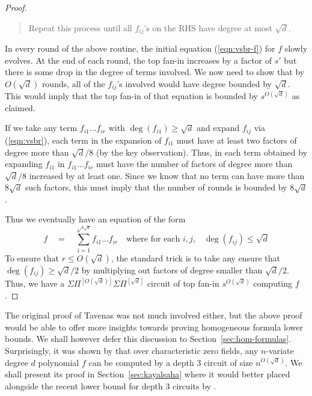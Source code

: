 \documentclass{beatcs}
\newcommand{\SPSPfanin}[2]{\Sigma\Pi^{[#1]}\Sigma\Pi^{[#2]}}
\begin{document}
\begin{proof}
\begin{mdframed}
\begin{quote}
Repeat this process until all $f_{ij}$'s on the RHS have degree at most $\sqrt{d}$. 
\end{quote}
\end{mdframed}

In every round of the above routine, the initial equation (\ref{eqn:vsbr-f}) for $f$ slowly evolves. 
At the end of each round, the top fan-in increases by a factor of $s'$ but there is some drop in the degree of terms involved. We now need to show that by $O(\sqrt{d})$ rounds, all of the $f_{ij}$'s involved would have degree bounded by $\sqrt{d}$. This would imply that the top fan-in of that equation is bounded by $s^{O(\sqrt{d})}$ as claimed. 

If we take any term $f_{i1}\dots f_{ir}$ with $\deg(f_{i1})\geq \sqrt{d}$ and expand $f_{ij}$ via (\ref{eqn:vsbr}), each term in the expansion of $f_{i1}$ must have at least two factors of degree more than $\sqrt{d}/8$ (by the key observation). Thus, in each term obtained by expanding $f_{i1}$ in $f_{i1}\dots f_{ir}$ must have the number of factors of degree more than $\sqrt{d}/8$ increased by at least one. Since we know that no term can have more than $8\sqrt{d}$ such factors, this must imply that the number of rounds is bounded by $8\sqrt{d}$. 

Thus we eventually have an equation of the form
\[
f\quad=\quad \sum_{i=1}^{s'^{8\sqrt{d}}} f_{i1}\dots f_{ir}\quad\text{where for each $i,j$,}\quad \deg(f_{ij})\leq \sqrt{d} 
\]
To ensure that $r\leq O(\sqrt{d})$, the standard trick is to take any ensure that $\deg(f_{ij}) \geq \sqrt{d}/2$ by multiplying out factors of degree smaller than $\sqrt{d}/2$. Thus, we have a $\SPSPfanin{O(\sqrt{d})}{\sqrt{d}}$ circuit of top fan-in $s^{O(\sqrt{d})}$ computing $f$. 
\end{proof}

The original proof of Tavenas was not much involved either, but the above proof would be able to offer more insights towards proving homogeneous formula lower bounds. We shall however defer this discussion to Section~\ref{sec:hom-formulas}. 
\\

Surprisingly, it was shown by \cite{gkks13b} that over characteristic zero fields, any $n$-variate degree $d$ polynomial $f$ can be computed by a depth $3$ circuit of size $n^{O(\sqrt{d})}$. We shall present its proof in Section~\ref{sec:kayalsaha} where it would better placed alongside the recent lower bound for depth $3$ circuits by \cite{KayalSaha14}. 
\end{document}
